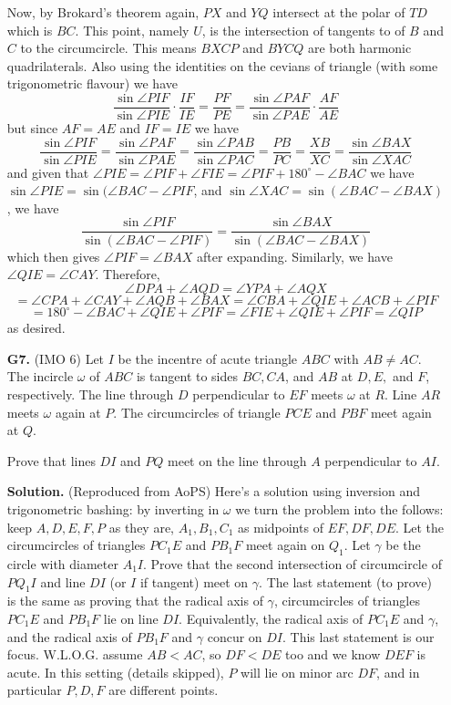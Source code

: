 \documentclass[11pt,a4paper]{article}
\begin{document}
\begin{enumerate}
	Now, by Brokard's theorem again, $PX$ and $YQ$ intersect at the polar of $TD$ which is $BC$. This point, namely $U$, is the intersection of tangents to of $B$ and $C$ to the circumcircle. This means $BXCP$ and $BYCQ$ are both harmonic quadrilaterals. Also using the identities on the cevians of triangle (with some trigonometric flavour) we have
	$$
	\frac{\sin\angle PIF}{\sin\angle PIE}\cdot \frac{IF}{IE} = \frac{PF}{PE} = \frac{\sin\angle PAF}{\sin\angle PAE}\cdot \frac{AF}{AE}
	$$but since $AF=AE$ and $IF=IE$ we have
	$$\frac{\sin\angle PIF}{\sin\angle PIE}=\frac{\sin\angle PAF}{\sin\angle PAE}=\frac{\sin\angle PAB}{\sin\angle PAC}= \frac{PB}{PC} = \frac{XB}{XC} = \frac{\sin\angle BAX}{\sin\angle XAC}$$and given that $\angle PIE = \angle PIF + \angle FIE = \angle PIF + 180^{\circ} - \angle BAC$ we have $\sin\angle PIE = \sin(\angle BAC - \angle PIF$, and $\sin \angle XAC = \sin(\angle BAC - \angle BAX)$, we have
	$$
	\frac{\sin\angle PIF}{ \sin(\angle BAC - \angle PIF)} = \frac{\sin\angle BAX}{\sin(\angle BAC - \angle BAX)}
	$$which then gives $\angle PIF = \angle BAX$ after expanding. Similarly, we have $\angle QIE = \angle CAY$. Therefore,
	$$
	\angle DPA + \angle AQD 
	=\angle YPA + \angle AQX
	$$
	$$
	=\angle CPA + \angle CAY + \angle AQB + \angle BAX
	=\angle CBA + \angle QIE + \angle ACB + \angle PIF 
	$$
	$$
	=180^{\circ} - \angle BAC+ \angle QIE + \angle PIF 
	=\angle FIE + \angle QIE + \angle PIF 
	=\angle QIP
	$$as desired.
	
	
	\item [\textbf{G7.}] (IMO 6) Let $I$ be the incentre of acute triangle $ABC$ with $AB\neq AC$. The incircle $\omega$ of $ABC$ is tangent to sides $BC, CA$, and $AB$ at $D, E,$ and $F$, respectively. The line through $D$ perpendicular to $EF$ meets $\omega$ at $R$. Line $AR$ meets $\omega$ again at $P$. The circumcircles of triangle $PCE$ and $PBF$ meet again at $Q$.
	
	Prove that lines $DI$ and $PQ$ meet on the line through $A$ perpendicular to $AI$.
	
	\textbf{Solution.} (Reproduced from AoPS) Here's a solution using inversion and trigonometric bashing: by inverting in $\omega$ we turn the problem into the follows: keep $A, D, E, F, P$ as they are, $A_1, B_1, C_1$ as midpoints of $EF, DF, DE$. Let the circumcircles of triangles $PC_1E$ and $PB_1F$ meet again on $Q_1$. Let $\gamma$ be the circle with diameter $A_1I$. Prove that the second intersection of circumcircle of $PQ_1I$ and line $DI$ (or $I$ if tangent) meet on $\gamma$. The last statement (to prove) is the same as proving that the radical axis of $\gamma$, circumcircles of triangles $PC_1E$ and $PB_1F$ lie on line $DI$. Equivalently, the radical axis of $PC_1E$ and $\gamma$, and the radical axis of $PB_1F$ and $\gamma$ concur on $DI$. This last statement is our focus. W.L.O.G. assume $AB<AC$, so $DF<DE$ too and we know $DEF$ is acute. In this setting (details skipped), $P$ will lie on minor arc $DF$, and in particular $P, D, F$ are different points.
	

\end{enumerate}
\end{document}
